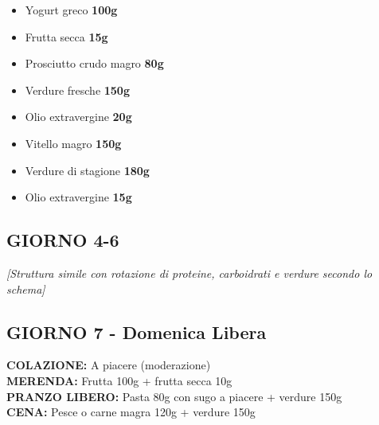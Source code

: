 \documentclass[11pt,a4paper]{article}
\begin{document}
\begin{tcolorbox}[colback=lightgray,colframe=accentcolor,boxrule=1pt,arc=3pt,title=\textbf{MERENDA MATTUTINA}]
\begin{itemize}[leftmargin=*,itemsep=0pt]
\item Yogurt greco \textbf{100g}
\item Frutta secca \textbf{15g}
\end{itemize}
\end{tcolorbox}

\begin{tcolorbox}[colback=lightgray,colframe=accentcolor,boxrule=1pt,arc=3pt,title=\textbf{PRANZO}]
\begin{itemize}[leftmargin=*,itemsep=0pt]
\item Prosciutto crudo magro \textbf{80g}
\item Verdure fresche \textbf{150g}
\item Olio extravergine \textbf{20g}
\end{itemize}
\end{tcolorbox}

\begin{tcolorbox}[colback=lightgray,colframe=accentcolor,boxrule=1pt,arc=3pt,title=\textbf{CENA}]
\begin{itemize}[leftmargin=*,itemsep=0pt]
\item Vitello magro \textbf{150g}
\item Verdure di stagione \textbf{180g}
\item Olio extravergine \textbf{15g}
\end{itemize}
\end{tcolorbox}

\subsection{GIORNO 4-6}
\textit{[Struttura simile con rotazione di proteine, carboidrati e verdure secondo lo schema]}

\subsection{GIORNO 7 - Domenica Libera}

\begin{tcolorbox}[colback=lightgray,colframe=maincolor,boxrule=2pt,arc=3pt,title=\textbf{GIORNATA LIBERA - Moderazione nelle quantità}]
\textbf{COLAZIONE:} A piacere (moderazione)\\
\textbf{MERENDA:} Frutta 100g + frutta secca 10g\\
\textbf{PRANZO LIBERO:} Pasta 80g con sugo a piacere + verdure 150g\\
\textbf{CENA:} Pesce o carne magra 120g + verdure 150g
\end{tcolorbox}
\end{document}
